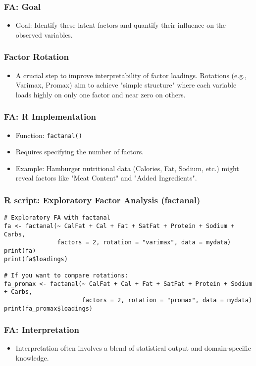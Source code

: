\documentclass{beamer}
\newcommand{\code}[1]{\texttt{#1}}
\begin{document}
\begin{frame}
    \frametitle{FA: Goal}
    \begin{itemize}
        \item Goal: Identify these latent factors and quantify their influence on the observed variables.
    \end{itemize}
\end{frame}

\begin{frame}
    \frametitle{Factor Rotation}
    \begin{itemize}
        \item A crucial step to improve interpretability of factor loadings. Rotations (e.g., Varimax, Promax) aim to achieve "simple structure" where each variable loads highly on only one factor and near zero on others.
    \end{itemize}
\end{frame}

\begin{frame}
    \frametitle{FA: R Implementation}
    \begin{itemize}
        \item Function: \code{factanal()}
        \item Requires specifying the number of factors.
        \item Example: Hamburger nutritional data (Calories, Fat, Sodium, etc.) might reveal factors like "Meat Content" and "Added Ingredients".
    \end{itemize}
\end{frame}

\begin{frame}[fragile]
    \frametitle{R script: Exploratory Factor Analysis (factanal)}
    \begin{verbatim}
# Exploratory FA with factanal
fa <- factanal(~ CalFat + Cal + Fat + SatFat + Protein + Sodium + Carbs,
               factors = 2, rotation = "varimax", data = mydata)
print(fa)
print(fa$loadings)

# If you want to compare rotations:
fa_promax <- factanal(~ CalFat + Cal + Fat + SatFat + Protein + Sodium + Carbs,
                      factors = 2, rotation = "promax", data = mydata)
print(fa_promax$loadings)
    \end{verbatim}
\end{frame}

\begin{frame}
    \frametitle{FA: Interpretation}
    \begin{itemize}
        \item Interpretation often involves a blend of statistical output and domain-specific knowledge.
    \end{itemize}
\end{frame}
\end{document}
